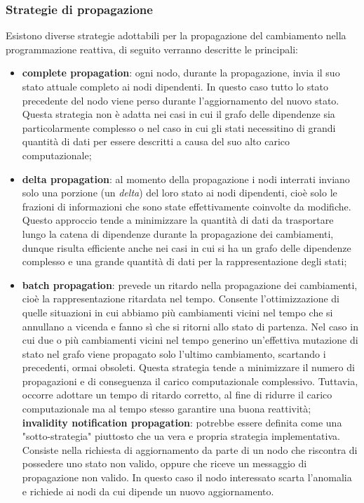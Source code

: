\documentclass[12pt,a4paper,openright,twoside]{book}
\begin{document}
\subsubsection{Strategie di propagazione}
Esistono diverse strategie adottabili per la propagazione del cambiamento nella programmazione reattiva, di seguito verranno descritte le principali:
\begin{itemize}
    \item \textbf{complete propagation}: ogni nodo, durante la propagazione, invia il suo stato attuale completo ai nodi dipendenti. In questo caso tutto lo stato precedente del nodo viene perso durante l'aggiornamento del nuovo stato. Questa strategia non è adatta nei casi in cui il grafo delle dipendenze sia particolarmente complesso o nel caso in cui gli stati necessitino di grandi quantità di dati per essere descritti a causa del suo alto carico computazionale;
    \item \textbf{delta propagation}: al momento della propagazione i nodi interrati inviano solo una porzione (un \textit{delta}) del loro stato ai nodi dipendenti, cioè solo le frazioni di informazioni che sono state effettivamente coinvolte da modifiche. Questo approccio tende a minimizzare la quantità di dati da trasportare lungo la catena di dipendenze durante la propagazione dei cambiamenti, dunque risulta efficiente anche nei casi in cui si ha un grafo delle dipendenze complesso e una grande quantità di dati per la rappresentazione degli stati; 
    \item \textbf{batch propagation}: prevede un ritardo nella propagazione dei cambiamenti, cioè la rappresentazione ritardata nel tempo. Consente l'ottimizzazione di quelle situazioni in cui abbiamo più cambiamenti vicini nel tempo che si annullano a vicenda e fanno sì che si ritorni allo stato di partenza. Nel caso in cui due o più cambiamenti vicini nel tempo generino un'effettiva mutazione di stato nel grafo viene propagato solo l'ultimo cambiamento, scartando i precedenti, ormai obsoleti. Questa strategia tende a minimizzare il numero di propagazioni e di conseguenza il carico computazionale complessivo. 
    Tuttavia, occorre adottare un tempo di ritardo corretto, al fine di ridurre il carico computazionale ma al tempo stesso garantire una buona reattività; 
    \textbf{invalidity notification propagation}: potrebbe essere definita come una "sotto-strategia" piuttosto che ua vera e propria strategia implementativa. Consiste nella richiesta di aggiornamento da parte di un nodo che riscontra di possedere uno stato non valido, oppure che riceve un messaggio di propagazione non valido. In questo caso il nodo interessato scarta l'anomalia e richiede ai nodi da cui dipende un nuovo aggiornamento. 
\end{itemize}
\end{document}
